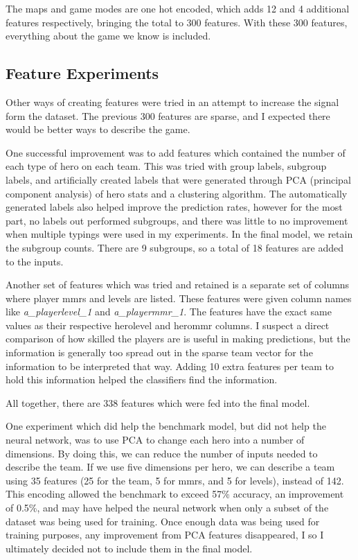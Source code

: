 \documentclass[twoside,twocolumn]{article}
\begin{document}
The maps and game modes are one hot encoded, which adds 12 and 4 additional features respectively, bringing the total to 300 features.  With these 300 features, everything about the game we know is included.

\subsection {Feature Experiments}

Other ways of creating features were tried in an attempt to increase the signal form the dataset.  The previous 300 features are sparse, and I expected there would be better ways to describe the game.

One successful improvement was to add features which contained the number of each type of hero on each team.  This was tried with group labels, subgroup labels, and artificially created labels that were generated through PCA (principal component analysis) of hero stats and a clustering algorithm.  The automatically generated labels also helped improve the prediction rates, however for the most part, no labels out performed subgroups, and there was little to no improvement when multiple typings were used in my experiments.  In the final model, we retain the subgroup counts.  There are 9 subgroups, so a total of 18 features are added to the inputs.

Another set of features which was tried and retained is a separate set of columns where player mmrs and levels are listed.  These features were given column names like \textit{a\_playerlevel\_1} and \textit{a\_playermmr\_1}.  The features have the exact same values as their respective herolevel and herommr columns. I suspect a direct comparison of how skilled the players are is useful in making predictions, but the information is generally too spread out in the sparse team vector for the information to be interpreted that way.  Adding 10 extra features per team to hold this information helped the classifiers find the information.

All together, there are 338 features which were fed into the final model.

One experiment which did help the benchmark model, but did not help the neural network, was to use PCA to change each hero into a number of dimensions.  By doing this, we can reduce the number of inputs needed to describe the team.  If we use five dimensions per hero, we can describe a team using 35 features (25 for the team, 5 for mmrs, and 5 for levels), instead of 142.  This encoding allowed the benchmark to exceed 57\% accuracy, an improvement of 0.5\%, and may have helped the neural network when only a subset of the dataset was being used for training.  Once enough data was being used for training purposes, any improvement from PCA features disappeared, I so I ultimately decided not to include them in the final model.
\end{document}
